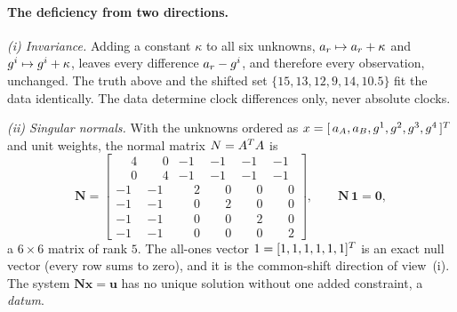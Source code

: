 \documentclass[main.tex]{subfiles}
\begin{document}
\paragraph{The deficiency from two directions.}
\emph{(i) Invariance.} Adding a constant $\kappa$ to all six unknowns,
$a_r \mapsto a_r + \kappa$ and $g^i \mapsto g^i + \kappa$,
leaves every difference $a_r - g^i$, and therefore every
observation, unchanged. The truth above and the shifted set
$\{15,13,12,9,14,10.5\}$ fit the data identically. The data determine
clock differences only, never absolute clocks.

\emph{(ii) Singular normals.} With the unknowns ordered as
$x = [\,a_A, a_B, g^1, g^2, g^3, g^4\,]^{T}$ and unit weights,
the normal matrix $N = A^{T}A$ is
\begin{equation}
\bm{N} =
\begin{bmatrix}
\phantom{-}4 & \phantom{-}0 & -1 & -1 & -1 & -1 \\
\phantom{-}0 & \phantom{-}4 & -1 & -1 & -1 & -1 \\
-1 & -1 & \phantom{-}2 & \phantom{-}0 & \phantom{-}0 & \phantom{-}0 \\
-1 & -1 & \phantom{-}0 & \phantom{-}2 & \phantom{-}0 & \phantom{-}0 \\
-1 & -1 & \phantom{-}0 & \phantom{-}0 & \phantom{-}2 & \phantom{-}0 \\
-1 & -1 & \phantom{-}0 & \phantom{-}0 & \phantom{-}0 & \phantom{-}2
\end{bmatrix},
\qquad
\bm{N}\,\bm{1} = \bm{0},
\label{eq:ex-code-normals}
\end{equation}
a $6\times6$ matrix of rank $5$. The all-ones vector
$1 = [1,1,1,1,1,1]^{T}$ is an exact null vector (every row sums to
zero), and it is the common-shift direction of view~(i). The system
$\bm{N}\bm{x} = \bm{u}$ has no unique solution without one added
constraint, a \emph{datum}.
\end{document}
